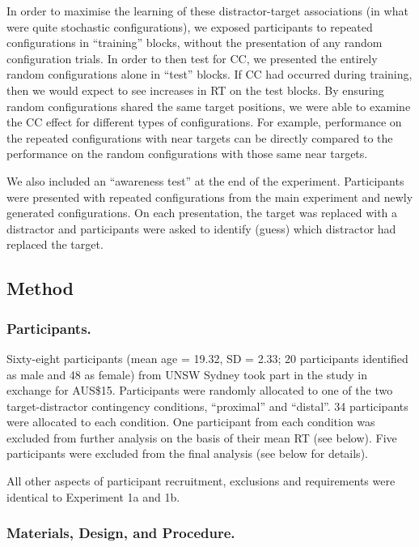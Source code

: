 \documentclass[
  man,floatsintext]{apa7}
\begin{document}
In order to maximise the learning of these distractor-target associations (in what were quite stochastic configurations), we exposed participants to repeated configurations in ``training'' blocks, without the presentation of any random configuration trials. In order to then test for CC, we presented the entirely random configurations alone in ``test'' blocks. If CC had occurred during training, then we would expect to see increases in RT on the test blocks. By ensuring random configurations shared the same target positions, we were able to examine the CC effect for different types of configurations. For example, performance on the repeated configurations with near targets can be directly compared to the performance on the random configurations with those same near targets.

We also included an ``awareness test'' at the end of the experiment. Participants were presented with repeated configurations from the main experiment and newly generated configurations. On each presentation, the target was replaced with a distractor and participants were asked to identify (guess) which distractor had replaced the target.

\hypertarget{method-2}{%
\subsection{Method}\label{method-2}}

\hypertarget{participants.-2}{%
\subsubsection{Participants.}\label{participants.-2}}

Sixty-eight participants (mean age = 19.32, SD = 2.33; 20 participants identified as male and 48 as female) from UNSW Sydney took part in the study in exchange for AUS\$15. Participants were randomly allocated to one of the two target-distractor contingency conditions, ``proximal'' and ``distal''. 34 participants were allocated to each condition. One participant from each condition was excluded from further analysis on the basis of their mean RT (see below). Five participants were excluded from the final analysis (see below for details).

All other aspects of participant recruitment, exclusions and requirements were identical to Experiment 1a and 1b.

\hypertarget{materials-design-and-procedure.-1}{%
\subsubsection{Materials, Design, and Procedure.}\label{materials-design-and-procedure.-1}}
\end{document}
